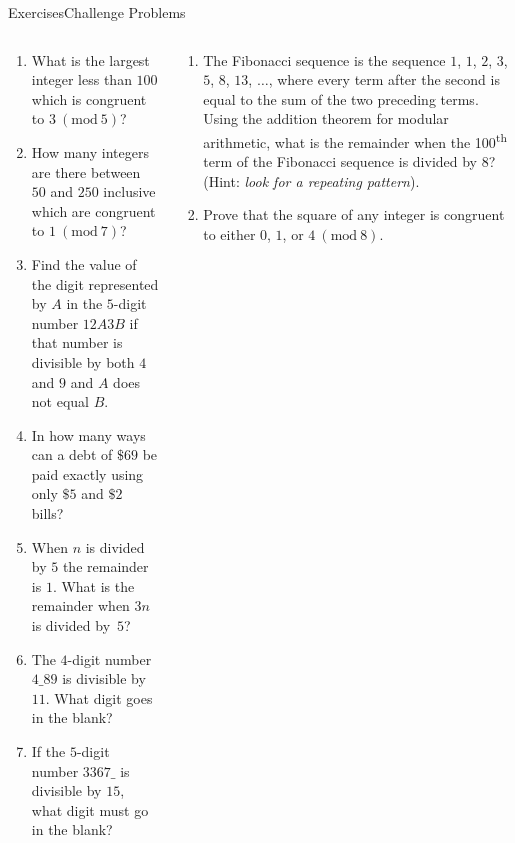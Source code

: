 \documentclass[9pt,aspectratio=169]{beamer}
\newcommand{\Mod}[1]{\ (\mathrm{mod}\ #1)}
\begin{document}
\begin{frame}{Exercises\hspace*{0.35\textwidth}Challenge Problems}
  \begin{columns}[T]
    \begin{column}{0.5\textwidth}
      \begin{enumerate}
        \item What is the largest integer less than $100$ which is congruent to $3 \Mod{5}$?
        \item How many integers are there between $50$ and $250$ inclusive which are congruent to $1\Mod{7}$?
        \item Find the value of the digit represented by $A$ in the $5$-digit number $12A3B$ if that number is divisible by both $4$ and $9$ and $A$ does not equal $B$.
        \item In how many ways can a debt of $\$69$ be paid exactly using only $\$5$ and $\$2$ bills?
        \item When $n$ is divided by $5$ the remainder is $1$. What is the remainder when $3n$ is divided by~$5$?
        \item The $4$-digit number $4\_89$ is divisible by $11$. What digit goes in the blank?
        \item If the $5$-digit number $3367\_$ is divisible by $15$, what digit must go in the blank?
      \end{enumerate}
    \end{column}
    \begin{column}{0.5\textwidth}
      \begin{enumerate}
        \item The Fibonacci sequence is the sequence $1$, $1$, $2$, $3$, $5$, $8$, $13$, $\dots$, where every term after the second is equal to the sum of the two preceding terms.  Using the addition theorem for modular arithmetic, what is the remainder when the 100\textsuperscript{th} term of the Fibonacci sequence is divided by $8$?  (Hint: \emph{look for a repeating  pattern}).
        \item Prove that the square of any integer is congruent to either $0$, $1$, or $4\Mod{8}$.
      \end{enumerate}
    \end{column}
  \end{columns}
\end{frame}

\end{document}
